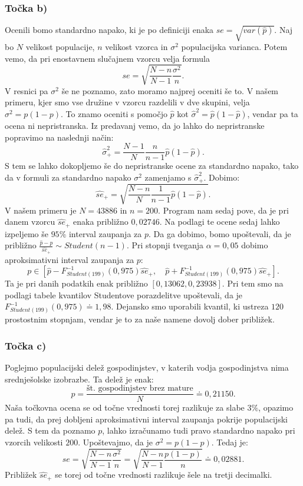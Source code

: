 \documentclass[12pt, letterpaper]{article}
\begin{document}
\subsubsection*{Točka b)} Ocenili bomo standardno napako, ki je po definiciji enaka $se = \sqrt{var(\hat{p})}$. Naj bo $N$ velikost populacije, $n$ velikost vzorca in $\sigma^2$ populacijska varianca. Potem vemo, da pri enostavnem slučajnem vzorcu velja formula
\[
se = \sqrt{\frac{N-n}{N-1}\frac{\sigma^2}{n}}.
\]
V resnici pa $\sigma^2$ še ne poznamo, zato moramo najprej oceniti še to. V našem primeru, kjer smo vse družine v vzorcu razdelili v dve skupini, velja $\sigma^2 = p(1-p)$. To znamo oceniti s pomočjo $\hat{p}$ kot $\hat{\sigma}^2 = \hat{p}(1 - \hat{p})$, vendar pa ta ocena ni nepristranska. Iz predavanj vemo, da jo lahko do nepristranske popravimo na naslednji način:
\[
\hat{\sigma}^2_+ = \frac{N-1}{N}\frac{n}{n-1} \hat{p}(1 - \hat{p}).
\]
S tem se lahko dokopljemo še do nepristranske ocene za standardno napako, tako da v formuli za standardno napako $\sigma^2$ zamenjamo s $\hat{\sigma}^2_+$. Dobimo:
\[
\hat{se}_+ = \sqrt{\frac{N-n}{N}\frac{1}{n-1}\hat{p}(1 - \hat{p})}.
\]
V našem primeru je $N = 43886$ in $n = 200$. Program nam sedaj pove, da je pri danem vzorcu $\hat{se}_+$ enaka približno $0,02746$. Na podlagi te ocene sedaj lahko izpeljemo še $95\%$ interval zaupanja za $p$. Da ga dobimo, bomo upoštevali, da je približno $\frac{\hat{p} - p}{\hat{se}_+} \sim Student(n-1)$. Pri stopnji tveganja $\alpha = 0,05$ dobimo aproksimativni interval zaupanja za $p$:
\[
p \in \left[\hat{p} - F_{Student(199)}^{-1}(0,975)\hat{se}_+, \quad \hat{p} + F_{Student(199)}^{-1}(0,975)\hat{se}_+\right].
\]
Ta je pri danih podatkih enak približno $[0,13062, 0,23938]$. Pri tem smo na podlagi tabele kvantilov Studentove porazdelitve upoštevali, da je $F_{Student(199)}^{-1}(0,975) \doteq 1,98$. Dejansko smo uporabili kvantil, ki ustreza $120$ prostostnim stopnjam, vendar je to za naše namene dovolj dober približek.

\subsubsection*{Točka c)} Poglejmo populacijski delež gospodinjstev, v katerih vodja gospodinjstva nima srednješolske izobrazbe. Ta delež je enak:
\[
p = \frac{\text{št. gospodinjstev brez mature}}{N} \doteq 0,21150.
\]
Naša točkovna ocena se od točne vrednosti torej razlikuje za slabe $3\%$, opazimo pa tudi, da prej dobljeni aproksimativni interval zaupanja pokrije populacijski delež.
S tem da poznamo $p$, lahko izračunamo tudi pravo standardno napako pri vzorcih velikosti $200$.
Upoštevajmo, da je $\sigma^2 = p(1-p)$. Tedaj je:
\[
se = \sqrt{\frac{N-n}{N-1}\frac{\sigma^2}{n}} = \sqrt{\frac{N-n}{N-1}\frac{p(1-p)}{n}} \doteq 0,02881.
\]
Približek $\hat{se}_+$ se torej od točne vrednosti razlikuje šele na tretji decimalki.
\end{document}

